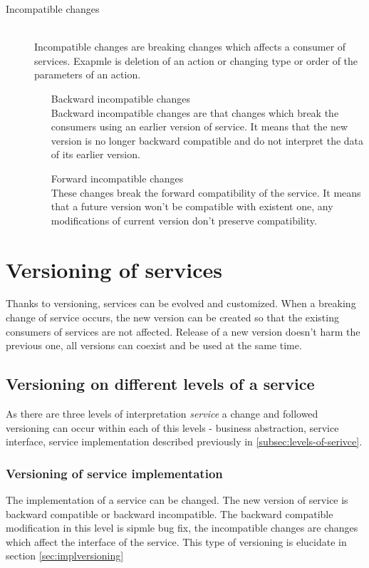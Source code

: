 \begin{description}
  \item[Incompatible changes] \hfill \\
  Incompatible changes are breaking changes which affects a consumer of services. Exapmle is deletion of an action or changing type or order of the parameters of an action.
  \begin{enumerate} 
    \item[Backward incompatible changes]  \hfill \\
    Backward incompatible changes are that changes which break the consumers using an earlier version of service. It means that the new version is no longer backward compatible and do not interpret the data of its earlier version.
    \item[Forward incompatible changes] \hfill \\
    These changes break the forward compatibility of the service. It means that a future version won't be compatible with existent one, any modifications of current version don't preserve compatibility.
  \end{enumerate}
\end{description}

\section{Versioning of services}
\label{sec:verioningservices}
Thanks to versioning, services can be evolved and customized. When a breaking change of service occurs, the new version can be created so that the existing consumers of services are not affected. Release of a new version doesn't harm the previous one, all versions can coexist and be used at the same time. 

\subsection{Versioning on different levels of a service}
As there are three levels of interpretation \emph{service} a change and followed versioning can occur within each of this levels - business abstraction, service interface, service implementation described previously in \ref{subsec:levels-of-serivce}.

\subsubsection{\textbf{Versioning of service implementation}}
The implementation of a service can be changed. The new version of service is backward compatible or backward incompatible. The backward compatible modification in this level is sipmle bug fix, the incompatible changes are changes which affect the interface of the service. This type of versioning is elucidate in section \ref{sec:implversioning}

